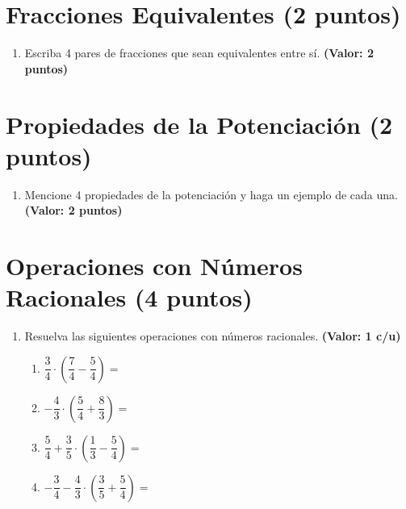 \documentclass[12pt, letterpaper]{article}
\begin{document}
\section{Fracciones Equivalentes (2 puntos)}

\begin{enumerate}[leftmargin=*, resume]

  \item Escriba 4 pares de fracciones que sean equivalentes entre sí. \hfill \textbf{(Valor: 2 puntos)}

\end{enumerate}

\section{Propiedades de la Potenciación (2 puntos)}

\begin{enumerate}[leftmargin=*, resume]

  \item Mencione 4 propiedades de la potenciación y haga un ejemplo de cada una. \hfill \textbf{(Valor: 2 puntos)}

\end{enumerate}

\section{Operaciones con Números Racionales (4 puntos)}

\begin{enumerate}[leftmargin=*, resume]

  \item Resuelva las siguientes operaciones con números racionales. \hfill \textbf{(Valor: 1 c/u)}
        \begin{enumerate}[label=\alph*), leftmargin=*]
          \item $\dfrac{3}{4} \cdot \left(\dfrac{7}{4} - \dfrac{5}{4}\right) =$
          \item $-\dfrac{4}{3} \cdot \left(\dfrac{5}{4} + \dfrac{8}{3}\right) =$
          \item $\dfrac{5}{4} + \dfrac{3}{5} \cdot \left(\dfrac{1}{3} - \dfrac{5}{4}\right) =$
          \item $-\dfrac{3}{4} - \dfrac{4}{3} \cdot \left(\dfrac{3}{5} + \dfrac{5}{4}\right) =$
        \end{enumerate}

\end{enumerate}
\end{document}
